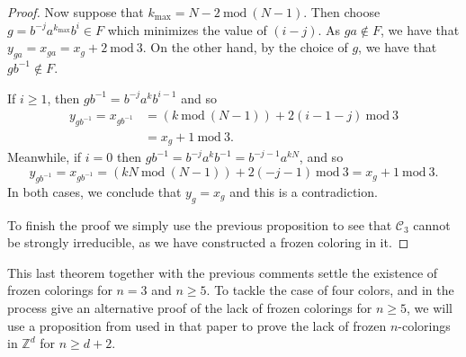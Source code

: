\documentclass[letterpaper,11pt,reqno]{amsart}
\theoremstyle{plain}
\theoremstyle{definition}
\begin{document}
\begin{proof}
	Now suppose that $k_{\mathrm{max}}=N-2\ \mathrm{mod}\ (N-1)$. Then choose $g=b^{-j}a^{k_{\mathrm{max}}}b^i\in F$ which minimizes the value of $(i-j)$. As $ga\notin F$, we have that $y_{ga}=x_{ga}=x_g+2\ \mathrm{mod}\ 3$. On the other hand, by the choice of $g$, we have that $gb^{-1}\notin F$.
	
	If $i\ge 1$, then $gb^{-1}=b^{-j}a^kb^{i-1}$ and so
	\begin{align*}
	y_{gb^{-1}}=x_{gb^{-1}}&=(k\ \mathrm{mod}\ (N-1))+2(i-1-j)\ \mathrm{mod}\ 3\\
	&=x_g+1\ \mathrm{mod}\ 3.
	\end{align*}
	Meanwhile, if $i=0$ then $gb^{-1}=b^{-j}a^kb^{-1}=b^{-j-1}a^{kN}$, and so
	$$
	y_{gb^{-1}}=x_{gb^{-1}}=(kN \ \mathrm{mod}\ (N-1))+2(-j-1)\ \mathrm{mod}\ 3=x_{g}+1\ \mathrm{mod}\ 3.
	$$
	In both cases, we conclude that $y_g=x_g$ and this is a contradiction.
	
	
	To finish the proof we simply use the previous proposition to see that $\mathcal{C}_3$ cannot be strongly irreducible, as we have constructed a frozen coloring in it.
\end{proof}

This last theorem together with the previous comments settle the existence of frozen colorings for $n=3$ and $n\ge 5$. To tackle the case of four colors, and in the process give an alternative proof of the lack of frozen colorings for $n\ge 5$, we will use a proposition from \cite{alon2019mixing} used in that paper to prove the lack of frozen $n$-colorings in $\mathbb{Z}^d$ for $n\ge d+2$.
\end{document}
